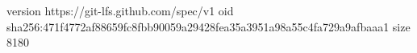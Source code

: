 version https://git-lfs.github.com/spec/v1
oid sha256:471f4772af88659fc8fbb90059a29428fea35a3951a98a55c4fa729a9afbaaa1
size 8180
